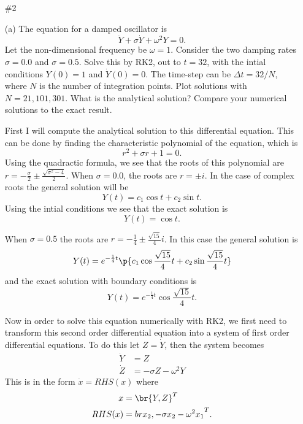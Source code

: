 \documentclass[11pt, oneside]{article}
\begin{document}
\begin{enumerate}
  \item[\#2]
    \item[(a)] %
      The equation for a damped oscillator is
      \[
        \ddot{Y} + \sigma \dot{Y} + \omega^2 Y = 0.
      \]
      Let the non-dimensional frequency be $\omega = 1$.
      Consider the two damping rates $\sigma=0.0$ and $\sigma=0.5$.
      Solve this by RK2, out to $t = 32$, with the intial conditions $Y(0) = 1$
      and $\dot{Y}(0) = 0$.
      The time-step can be $\Delta t = 32/N$, where $N$ is the number of
      integration points.
      Plot solutions with $N = 21, 101, 301$.
      What is the analytical solution?
      Compare your numerical solutions to the exact result.

      First I will compute the analytical solution to this differential
      equation.
      This can be done by finding the characteristic polynomial of the equation,
      which is
      \[
        r^2 + \sigma r + 1 = 0.
      \]
      Using the quadractic formula, we see that the roots of this polynomial
      are $r = -\frac{\sigma}{2} \pm \frac{\sqrt{\sigma^2 - 4}}{2}$.
      When $\sigma = 0.0$, the roots are $r = \pm i$.
      In the case of complex roots the general solution will be
      \[
        Y(t) = c_1 \cos{t} + c_2 \sin{t}.
      \]
      Using the intial conditions we see that the exact solution is
      \[
        Y(t) = \cos{t}.
      \]

      When $\sigma = 0.5$ the roots are $r = -\frac{1}{4} \pm \frac{\sqrt{15}}{4} i$.
      In this case the general solution is
      \[
        Y(t) = e^{-\frac{1}{4}t} \p{c_1 \cos{\frac{\sqrt{15}}{4} t} + c_2 \sin{\frac{\sqrt{15}}{4} t}}
      \]
      and the exact solution with boundary conditions is
      \[
        Y(t) = e^{-\frac{1}{4}t} \cos{\frac{\sqrt{15}}{4} t}.
      \]

      Now in order to solve this equation numerically with RK2, we first need to
      transform this second order differential equation into a system of first
      order differential equations.
      To do this let $Z = \dot{Y}$, then the system becomes
      \begin{align*}
        \dot{Y} &= Z \\
        \dot{Z} &= -\sigma Z - \omega^2 Y
      \end{align*}
      This is in the form $\dot{x} = RHS(x)$ where
      \begin{align*}
        x &= \br{Y, Z}^T \\
        RHS(x) &= br{x_2, -\sigma x_2 - \omega^2 x_1}^T.
      \end{align*}


\end{enumerate}
\end{document}
